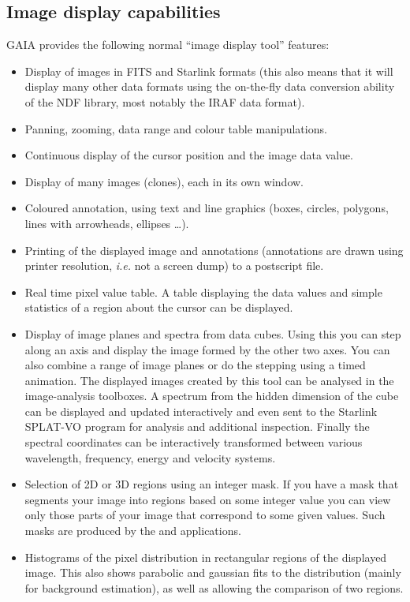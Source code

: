 \documentclass[twoside,11pt,nolof]{starlink}
\begin{document}
\subsection{Image display capabilities}
GAIA provides the following normal ``image display tool'' features:
\begin{itemize}
\item Display of images in FITS and Starlink 
  formats (this also means that it will display many other data formats
  using the on-the-fly data conversion ability of the NDF library, most
  notably the IRAF data format).

\item Panning, zooming, data range and colour table manipulations.

\item Continuous display of the cursor position and the image data
  value.

\item Display of many images (clones), each in its own window.

\item Coloured annotation, using text and line graphics (boxes,
  circles, polygons, lines with arrowheads, ellipses \ldots).

\item Printing of the displayed image and annotations (annotations
  are drawn using printer resolution, \textit{i.e.} not a screen dump)
  to a postscript file.

\item Real time pixel value table. A table displaying the data
  values and simple statistics of a region about the cursor can be
  displayed.

\item Display of image planes and spectra from data cubes. Using this you can
  step along an axis and display the image formed by the other two axes.  You
  can also combine a range of image planes or do the stepping using a timed
  animation. The displayed images created by this tool can be analysed in the
  image-analysis toolboxes. A spectrum from the hidden dimension of the cube
  can be displayed and updated interactively and even sent to the Starlink
  SPLAT-VO program for analysis and additional inspection. Finally the
  spectral coordinates can be interactively transformed between various
  wavelength, frequency, energy and velocity systems.

\item Selection of 2D or 3D regions using an integer mask. If you have a mask
  that segments your image into regions based on some integer value you can
  view only those parts of your image that correspond to some given values.
  Such masks are produced by the 
  and  applications.

\item Histograms of the pixel distribution in rectangular regions of the
  displayed image. This also shows parabolic and gaussian fits to the
  distribution (mainly for background estimation), as well as allowing the
  comparison of two regions.

\end{itemize}
\end{document}
